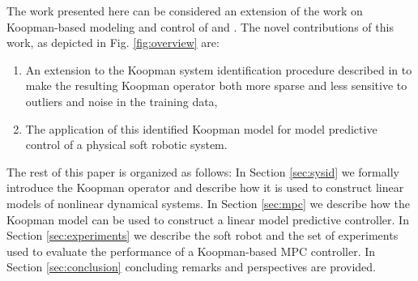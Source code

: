 The work presented here can be considered an extension of the work on Koopman-based modeling and control of \citet{mauroy2016linear} and \citet{korda2018linear}.
The novel contributions of this work, as depicted in Fig. \ref{fig:overview} are:
\begin{enumerate}
    \item An extension to the Koopman system identification procedure described in \cite{mauroy2016linear} to make the resulting Koopman operator both more sparse and less sensitive to outliers and noise in the training data,
    \item The application of this identified Koopman model for model predictive control of a physical soft robotic system.
\end{enumerate}




The rest of this paper is organized as follows:
In Section \ref{sec:sysid} we formally introduce the Koopman operator and describe how it is used to construct linear models of nonlinear dynamical systems. 
In Section \ref{sec:mpc} we describe how the Koopman model can be used to construct a linear model predictive controller.
In Section \ref{sec:experiments} we describe the soft robot and the set of experiments used to evaluate the performance of a Koopman-based MPC controller.
In Section \ref{sec:conclusion} concluding remarks and perspectives are provided.

